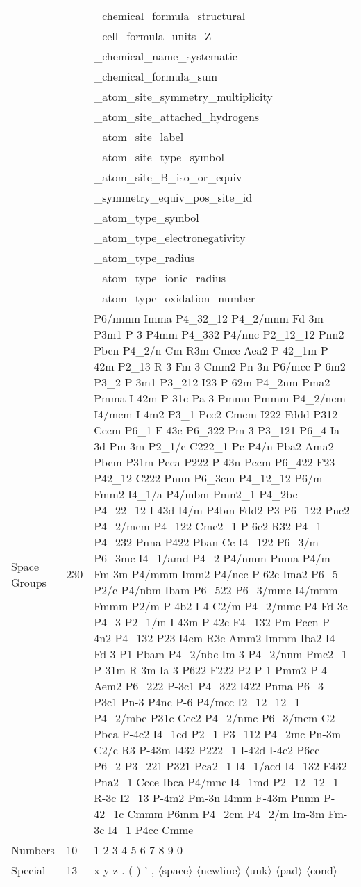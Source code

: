 \begin{table}[ht!]
\begin{tabular}{p{1.5cm}p{1cm}p{10cm}}
& & \_chemical\_formula\_structural \\
& & \_cell\_formula\_units\_Z \\
& & \_chemical\_name\_systematic \\
& & \_chemical\_formula\_sum  \\
& & \_atom\_site\_symmetry\_multiplicity \\
& & \_atom\_site\_attached\_hydrogens \\
& & \_atom\_site\_label\\
& & \_atom\_site\_type\_symbol  \\
& & \_atom\_site\_B\_iso\_or\_equiv \\
& & \_symmetry\_equiv\_pos\_site\_id \\
& & \_atom\_type\_symbol \\
& & \_atom\_type\_electronegativity  \\
& & \_atom\_type\_radius  \\
& & \_atom\_type\_ionic\_radius  \\
& & \_atom\_type\_oxidation\_number  \\
\midrule
Space Groups & 230 & P6/mmm  Imma  P4\_32\_12  P4\_2/mnm  Fd-3m  P3m1  P-3  P4mm  P4\_332  P4/nnc  P2\_12\_12  Pnn2  Pbcn  P4\_2/n  Cm  R3m  Cmce  Aea2  P-42\_1m  P-42m  P2\_13  R-3  Fm-3  Cmm2  Pn-3n  P6/mcc  P-6m2  P3\_2  P-3m1  P3\_212  I23  P-62m  P4\_2nm  Pma2  Pmma  I-42m  P-31c  Pa-3  Pmmn  Pmmm  P4\_2/ncm  I4/mcm  I-4m2  P3\_1  Pcc2  Cmcm  I222  Fddd  P312  Cccm  P6\_1  F-43c  P6\_322  Pm-3  P3\_121  P6\_4  Ia-3d  Pm-3m  P2\_1/c  C222\_1  Pc  P4/n  Pba2  Ama2  Pbcm  P31m  Pcca  P222  P-43n  Pccm  P6\_422  F23  P42\_12  C222  Pnnn  P6\_3cm  P4\_12\_12  P6/m  Fmm2  I4\_1/a  P4/mbm  Pmn2\_1  P4\_2bc  P4\_22\_12  I-43d  I4/m  P4bm  Fdd2  P3  P6\_122  Pnc2  P4\_2/mcm  P4\_122  Cmc2\_1  P-6c2  R32  P4\_1  P4\_232  Pnna  P422  Pban  Cc  I4\_122  P6\_3/m  P6\_3mc  I4\_1/amd  P4\_2  P4/nmm  Pmna  P4/m  Fm-3m  P4/mmm  Imm2  P4/ncc  P-62c  Ima2  P6\_5  P2/c  P4/nbm  Ibam  P6\_522  P6\_3/mmc  I4/mmm  Fmmm  P2/m  P-4b2  I-4  C2/m  P4\_2/mmc  P4  Fd-3c  P4\_3  P2\_1/m  I-43m  P-42c  F4\_132  Pm  Pccn  P-4n2  P4\_132  P23  I4cm  R3c  Amm2  Immm  Iba2  I4  Fd-3  P1  Pbam  P4\_2/nbc  Im-3  P4\_2/nnm  Pmc2\_1  P-31m  R-3m  Ia-3  P622  F222  P2  P-1  Pmm2  P-4  Aem2  P6\_222  P-3c1  P4\_322  I422  Pnma  P6\_3  P3c1  Pn-3  P4nc  P-6  P4/mcc  I2\_12\_12\_1  P4\_2/mbc  P31c  Ccc2  P4\_2/nmc  P6\_3/mcm  C2  Pbca  P-4c2  I4\_1cd  P2\_1  P3\_112  P4\_2mc  Pn-3m  C2/c  R3  P-43m  I432  P222\_1  I-42d  I-4c2  P6cc  P6\_2  P3\_221  P321  Pca2\_1  I4\_1/acd  I4\_132  F432  Pna2\_1  Ccce  Ibca  P4/mnc  I4\_1md  P2\_12\_12\_1  R-3c  I2\_13  P-4m2  Pm-3n  I4mm  F-43m  Pnnm  P-42\_1c  Cmmm  P6mm  P4\_2cm  P4\_2/m  Im-3m  Fm-3c  I4\_1  P4cc  Cmme \\
\midrule
Numbers & 10 & 1 2 3 4 5 6 7 8 9 0 \\
\midrule
Special & 13 & x y z . ( ) ’ , $\langle$space$\rangle$ $\langle$newline$\rangle$ $\langle$unk$\rangle$  $\langle$pad$\rangle$  $\langle$cond$\rangle$ \\
\bottomrule
\end{tabular}
\label{sup-table:tokens}
\end{table}

